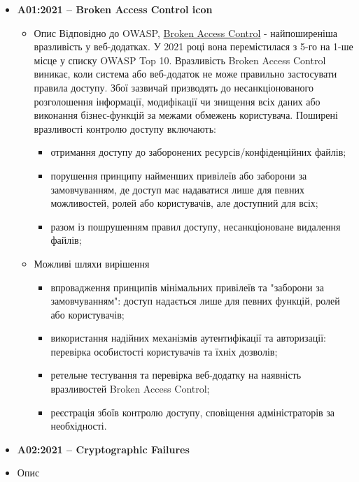 \begin{itemize}
    \item \textbf{A01:2021 – Broken Access Control icon}
        \begin{itemize}
            \item Опис
                 Відповідно до OWASP, \href{https://owasp.org/Top10/A01_2021-Broken_Access_Control/}{Broken Access Control} - найпоширеніша вразливість у веб-додатках. У 2021 році вона перемістилася з 5-го на 1-ше місце у списку OWASP Top 10. Вразливість Broken Access Control виникає, коли система або веб-додаток не може правильно застосувати правила доступу. Збої зазвичай призводять до несанкціонованого розголошення інформації, модифікації чи знищення всіх даних або виконання бізнес-функцій за межами обмежень користувача. Поширені вразливості контролю доступу включають:
                \begin{itemize}
                    \item отримання доступу до заборонених ресурсів/конфіденційних файлів;
                    \item порушення принципу найменших привілеїв або заборони за замовчуванням, де доступ має надаватися лише для певних можливостей, ролей або користувачів, але доступний для всіх;
                    \item разом із пошрушенням правил доступу, несанкціоноване видалення файлів;
                \end{itemize}
            \item Можливі шляхи вирішення
                \begin{itemize}
                    \item впровадження принципів мінімальних привілеїв та "заборони за замовчуванням": доступ надається лише для певних функцій, ролей або користувачів;
                    \item використання надійних механізмів аутентифікації та авторизації: перевірка особистості користувачів та їхніх дозволів;
                    \item ретельне тестування та перевірка веб-додатку на наявність вразливостей Broken Access Control;
                    \item реєстрація збоїв контролю доступу, сповіщення адміністраторів за необхідності.
                \end{itemize}
        \end{itemize}
    \item \textbf{A02:2021 – Cryptographic Failures} 
            \item Опис

\end{itemize}
